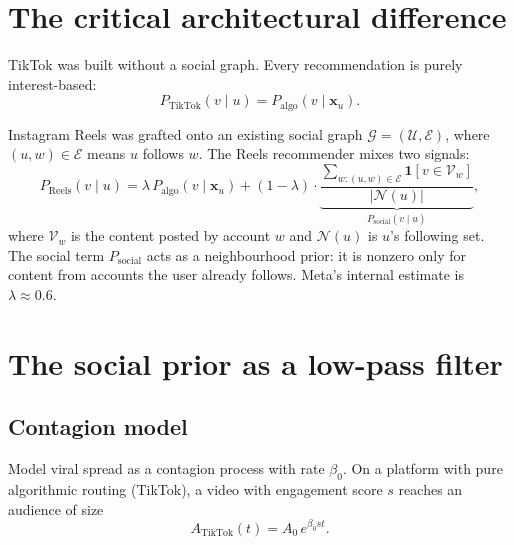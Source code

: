 \documentclass[12pt,a4paper]{article}
\begin{document}
\section{The critical architectural difference}
\label{sec:arch}

TikTok was built without a social graph. Every recommendation is purely interest-based:
\begin{equation}
  P_{\text{TikTok}}(v \mid u) = P_{\text{algo}}(v \mid \mathbf{x}_u).
  \label{eq:tiktok_recom}
\end{equation}

Instagram Reels was grafted onto an existing social graph $\mathcal{G} = (\mathcal{U}, \mathcal{E})$, where $(u, w) \in \mathcal{E}$ means $u$ follows $w$. The Reels recommender mixes two signals:
\begin{equation}
  P_{\text{Reels}}(v \mid u) = \lambda \, P_{\text{algo}}(v \mid \mathbf{x}_u) + (1 - \lambda) \cdot \underbrace{\frac{\sum_{w : (u,w) \in \mathcal{E}} \mathbf{1}[v \in \mathcal{V}_w]}{|\mathcal{N}(u)|}}_{P_{\text{social}}(v \mid u)},
  \label{eq:reels_recom}
\end{equation}
where $\mathcal{V}_w$ is the content posted by account $w$ and $\mathcal{N}(u)$ is $u$'s following set. The social term $P_{\text{social}}$ acts as a neighbourhood prior: it is nonzero only for content from accounts the user already follows. Meta's internal estimate is $\lambda \approx 0.6$.

\section{The social prior as a low-pass filter}
\label{sec:lowpass}

\subsection{Contagion model}

Model viral spread as a contagion process with rate $\beta_0$. On a platform with pure algorithmic routing (TikTok), a video with engagement score $s$ reaches an audience of size
\begin{equation}
  A_{\text{TikTok}}(t) = A_0 \, e^{\beta_0 s t}.
  \label{eq:tiktok_spread}
\end{equation}
\end{document}
